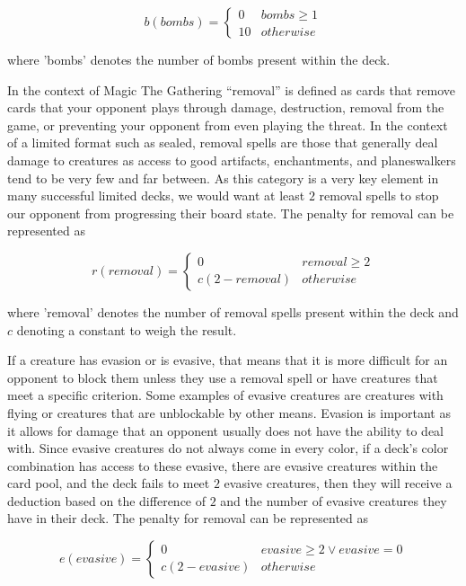 \documentclass[12pt, letterpaper]{article}
\begin{document}
$$
b(bombs) = \begin{cases}
    0 & bombs \ge 1 \\
    10 & otherwise
\end{cases}
$$

where 'bombs' denotes the number of bombs present within the deck.

In the context of Magic The Gathering \enquote{removal} is defined as
cards that remove cards that your opponent plays through
damage, destruction, removal from the game, or preventing your opponent from even playing the threat.
In the context of a limited format such as sealed,
removal spells are those that generally deal damage to creatures as access to good
artifacts, enchantments, and planeswalkers tend to be very few and far between.
As this category is a very key element in many successful limited decks,
we would want at least $ 2 $ removal spells to stop our opponent from progressing their board state.
The penalty for removal can be represented as

$$
r(removal) = \begin{cases}
    0 & removal \ge 2 \\
    c(2-removal) & otherwise
\end{cases}
$$

where 'removal' denotes the number of removal spells present within the deck
and $ c $ denoting a constant to weigh the result.

If a creature has evasion or is evasive,
that means that it is more difficult for an opponent to block them
unless they use a removal spell or have creatures that meet a specific criterion.
Some examples of evasive creatures are creatures
with flying or creatures that are unblockable by other means.
Evasion is important as it allows for damage that an
opponent usually does not have the ability to deal with.
Since evasive creatures do not always come in every color,
if a deck’s color combination has access to these evasive,
there are evasive creatures within the card pool, and the deck fails to meet $ 2 $ evasive creatures,
then they will receive a deduction based on the difference of $ 2 $
and the number of evasive creatures they have in their deck.
The penalty for removal can be represented as

$$
e(evasive) = \begin{cases}
    0 & evasive \ge 2 \lor evasive = 0 \\
    c(2-evasive) & otherwise
\end{cases}
$$
\end{document}
